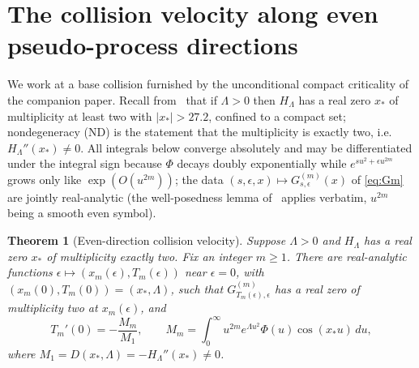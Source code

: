 \documentclass[11pt,reqno]{amsart}
\theoremstyle{plain}
\newtheorem{theorem}{Theorem}[section]
\theoremstyle{definition}
\theoremstyle{remark}
\begin{document}
\begin{center}
\end{center}

\section{The collision velocity along even pseudo-process directions}
\label{sec:velocity}

We work at a base collision furnished by the unconditional compact
criticality of the companion paper. Recall from~\cite{Fsymbol} that if
$\Lambda>0$ then $H_\Lambda$ has a real zero $x_*$ of multiplicity at least
two with $|x_*|>27.2$, confined to a compact set; nondegeneracy (ND) is the
statement that the multiplicity is exactly two, i.e.\ $H_\Lambda''(x_*)\neq0$.
All integrals below converge absolutely and may be differentiated under the
integral sign because $\Phi$ decays doubly exponentially while
$e^{su^2+\epsilon u^{2m}}$ grows only like $\exp(O(u^{2m}))$; the data
$(s,\epsilon,x)\mapsto G^{(m)}_{s,\epsilon}(x)$ of \eqref{eq:Gm} are jointly
real-analytic (the well-posedness lemma of~\cite{Fsymbol} applies verbatim,
$u^{2m}$ being a smooth even symbol).

\begin{theorem}[Even-direction collision velocity]\label{thm:velocity}
Suppose $\Lambda>0$ and $H_\Lambda$ has a real zero $x_*$ of multiplicity
exactly two. Fix an integer $m\ge1$. There are real-analytic functions
$\epsilon\mapsto(x_m(\epsilon),T_m(\epsilon))$ near $\epsilon=0$, with
$(x_m(0),T_m(0))=(x_*,\Lambda)$, such that $G^{(m)}_{T_m(\epsilon),\epsilon}$
has a real zero of multiplicity two at $x_m(\epsilon)$, and
\begin{equation}\label{eq:velocity}
  T_m'(0)=-\frac{M_m}{M_1},
  \qquad
  M_m=\int_0^\infty u^{2m}e^{\Lambda u^2}\Phi(u)\cos(x_*u)\,du,
\end{equation}
where $M_1=D(x_*,\Lambda)=-H_\Lambda''(x_*)\neq0$.
\end{theorem}
\end{document}
